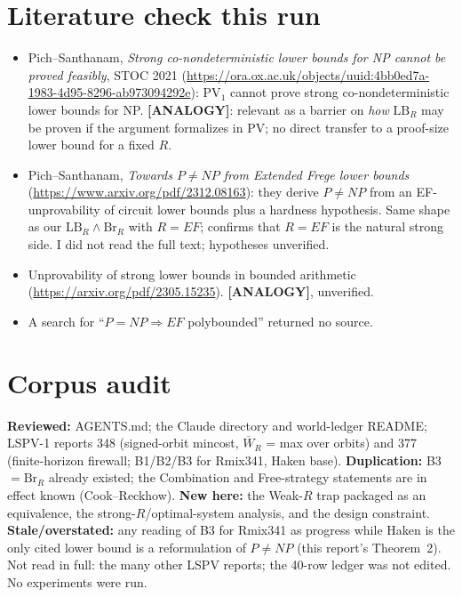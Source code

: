 \documentclass[11pt]{article}
\newcommand{\status}[1]{\textbf{[#1]}}
\begin{document}
\section{Literature check this run}
\begin{itemize}
\item Pich--Santhanam, \emph{Strong co-nondeterministic lower bounds for NP cannot be proved feasibly}, STOC 2021 (\url{https://ora.ox.ac.uk/objects/uuid:4bb0ed7a-1983-4d95-8296-ab973094292e}): PV$_1$ cannot prove strong co-nondeterministic lower bounds for NP. \status{ANALOGY}: relevant as a barrier on \emph{how} $\mathrm{LB}_R$ may be proven if the argument formalizes in PV; no direct transfer to a proof-size lower bound for a fixed $R$.
\item Pich--Santhanam, \emph{Towards $P\ne NP$ from Extended Frege lower bounds} (\url{https://www.arxiv.org/pdf/2312.08163}): they derive $P\ne NP$ from an EF-unprovability of circuit lower bounds plus a hardness hypothesis. Same shape as our $\mathrm{LB}_R\wedge\mathrm{Br}_R$ with $R=EF$; confirms that $R=EF$ is the natural strong side. I did not read the full text; hypotheses unverified.
\item Unprovability of strong lower bounds in bounded arithmetic (\url{https://arxiv.org/pdf/2305.15235}). \status{ANALOGY}, unverified.
\item A search for ``$P=NP\Rightarrow EF$ polybounded'' returned no source.
\end{itemize}

\section{Corpus audit}
\textbf{Reviewed:} AGENTS.md; the Claude directory and world-ledger README; LSPV-1 reports 348 (signed-orbit mincost, $\overline W_R$ = max over orbits) and 377 (finite-horizon firewall; B1/B2/B3 for Rmix341, Haken base). \textbf{Duplication:} B3 $=\mathrm{Br}_R$ already existed; the Combination and Free-strategy statements are in effect known (Cook--Reckhow). \textbf{New here:} the Weak-$R$ trap packaged as an equivalence, the strong-$R$/optimal-system analysis, and the design constraint. \textbf{Stale/overstated:} any reading of B3 for Rmix341 as progress while Haken is the only cited lower bound is a reformulation of $P\ne NP$ (this report's Theorem~2). Not read in full: the many other LSPV reports; the 40-row ledger was not edited. No experiments were run.
\end{document}

